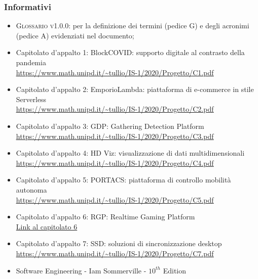 \subsubsection{Informativi}
\begin{itemize}
	\item \textsc{Glossario v1.0.0}: per la definizione dei termini (pedice G) e degli acronimi (pedice A) evidenziati nel documento;
	\item Capitolato d'appalto 1: BlockCOVID: supporto digitale al contrasto della pandemia\\
	\uline{\url{https://www.math.unipd.it/~tullio/IS-1/2020/Progetto/C1.pdf}}
	\item Capitolato d'appalto 2: EmporioLambda: piattaforma di e-commerce in stile Serverless\\
	\uline{\url{https://www.math.unipd.it/~tullio/IS-1/2020/Progetto/C2.pdf}}
	\item Capitolato d'appalto 3: GDP: Gathering Detection Platform\\
	\uline{\url{https://www.math.unipd.it/~tullio/IS-1/2020/Progetto/C3.pdf}}
	\item Capitolato d'appalto 4: HD Viz: visualizzazione di dati multidimensionali\\
	\uline{\url{https://www.math.unipd.it/~tullio/IS-1/2020/Progetto/C4.pdf}}
	\item Capitolato d'appalto 5: PORTACS: piattaforma di controllo mobilità autonoma\\
	\uline{\url{https://www.math.unipd.it/~tullio/IS-1/2020/Progetto/C5.pdf}}
	\item Capitolato d'appalto 6: RGP: Realtime Gaming Platform\\
 \href{https://sesaspa-my.sharepoint.com/:b:/g/personal/s_dindo_vargroup_it/EThvay0f6KVCoXydYOce2lkBt-MYcnW1yafRXFXVIOIsHg?e=2emZZI}{Link al capitolato 6}
	\item Capitolato d'appalto 7: SSD: soluzioni di sincronizzazione desktop\\
	\uline{\url{https://www.math.unipd.it/~tullio/IS-1/2020/Progetto/C7.pdf}}
	\item Software Engineering - Iam Sommerville - $10^{th}$ Edition
\end{itemize}